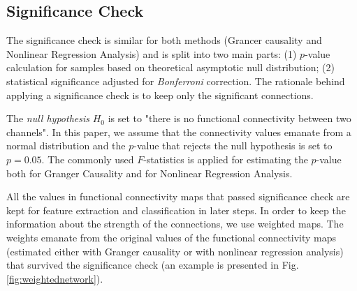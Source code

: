 \subsection{Significance Check}
The significance check is similar for both methods (Grancer causality and Nonlinear Regression Analysis) and is split into two main parts: (1) $p$-value calculation for samples based on theoretical asymptotic null distribution; (2) statistical significance adjusted for \emph{Bonferroni} correction. The rationale behind applying a significance check is to keep only the significant connections. 

The \emph{null hypothesis} $H_0$ is set to "there is no functional connectivity between two channels". In this paper, we assume that the connectivity values emanate from a normal distribution and the $p$-value that rejects the null hypothesis is set to $p=0.05$. The commonly used $F$-statistics is applied for estimating the $p$-value both for Granger Causality and for Nonlinear Regression Analysis.

All the values in functional connectivity maps that passed significance check are kept for feature extraction and classification in later steps. In order to keep the information about the strength of the connections, we use weighted maps. The weights emanate from the original values of the functional connectivity maps (estimated either with Granger causality or with nonlinear regression analysis) that survived the significance check (an example is presented in Fig. \ref{fig:weightednetwork}).



